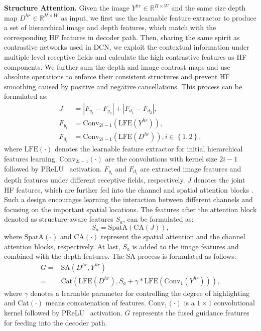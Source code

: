 \documentclass[letterpaper]{article} %
\begin{document}
\textbf{Structure Attention.} 
Given the image $Y^{hr}\in \mathbb{R}^{H\times W}$ and the same size depth map $D^{hr}\in \mathbb{R}^{H\times W}$ as input, we first use the learnable feature extractor to produce a set of hierarchical image and depth features, which match with the corresponding  HF features in decoder path. Then, sharing the same spirit as contrastive networks used in DCN, we exploit the contextual information under multiple-level receptive fields and calculate the high contrastive features as HF components. We further sum the depth and image contrast maps and use absolute operations to enforce their consistent structures and prevent HF smoothing caused by positive and negative cancellations. This process can be formulated as:
\begin{align} 
J&=|F_{y_{1}}-F_{y_{2}}| + |F_{d_{1}}-F_{d_{2}}|, \\
F_{y_{i}}&=\text{Conv}_{2i-1}(\text{LFE}(Y^{hr})),\\
F_{d_{i}}&=\text{Conv}_{2i-1}(\text{LFE}(D^{hr})), i\in\left\{1,2\right\},
\end{align} 
where $\text{LFE}(\cdot)$ denotes the learnable feature extractor for initial hierarchical features learning. $\text{Conv}_{2i-1}(\cdot)$ are the convolutions with kernel size $2i-1$ followed by PReLU~\cite{he2015delving} activation. $F_{y_{i}}$ and $F_{d_{i}}$ are extracted image features and depth features under different receptive fields, respectively. $J$ denotes the joint HF features, which are further fed into the channel and spatial attention blocks \cite{woo2018cbam}. Such a design encourages learning the interaction between different channels and focusing on the important spatial locations. The features after the attention block denoted as structure-aware features $S_{a}$, can be formulated as:
\begin{equation}
S_{a}=\text{SpatA}(\text{CA}(J)),
\end{equation} 
where $\text{SpatA}(\cdot)$ and $\text{CA}(\cdot)$ represent the spatial attention and the channel attention blocks, respectively. At last, $S_{a}$ is added to the image features and combined with the depth features. The SA process is formulated as follows:
\begin{align}
G=&\text{SA}(D^{hr},Y^{hr}) \nonumber \\
=&\text{Cat}(\text{LFE}(D^{hr}), S_{a}+\gamma*\text{LFE}(\text{Conv}_{1}(Y^{hr}))),
\label{eq:fy}
\end{align} 
where $\gamma$ denotes a learnable parameter for controlling the degree of highlighting and $\text{Cat}(\cdot)$ means concatenation of features. $\text{Conv}_{1}(\cdot)$ is a $1\times1$ convolutional kernel followed by PReLU~\cite{he2015delving} activation. $G$ represents the fused guidance features for feeding into the decoder path.
\end{document}
